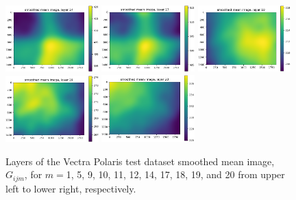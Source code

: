 \documentclass[letterpaper,11pt]{article}
\begin{document}
\begin{figure}[!ht]
\includegraphics[width=0.32\textwidth]{images/results/smoothed_mean_image_layers_polaris/smoothed_mean_image_layer_14}
\includegraphics[width=0.32\textwidth]{images/results/smoothed_mean_image_layers_polaris/smoothed_mean_image_layer_17}
\includegraphics[width=0.32\textwidth]{images/results/smoothed_mean_image_layers_polaris/smoothed_mean_image_layer_18}
\includegraphics[width=0.32\textwidth]{images/results/smoothed_mean_image_layers_polaris/smoothed_mean_image_layer_19}
\includegraphics[width=0.32\textwidth]{images/results/smoothed_mean_image_layers_polaris/smoothed_mean_image_layer_20}
\caption{\footnotesize Layers of the Vectra Polaris test dataset smoothed mean image, $G_{ijm}$, for $m=$1, 5, 9, 10, 11, 12, 14, 17, 18, 19, and 20 from upper left to lower right, respectively.}
\label{fig:uncorrected_mean_image_layers_polaris_1}
\end{figure}
\end{document}
